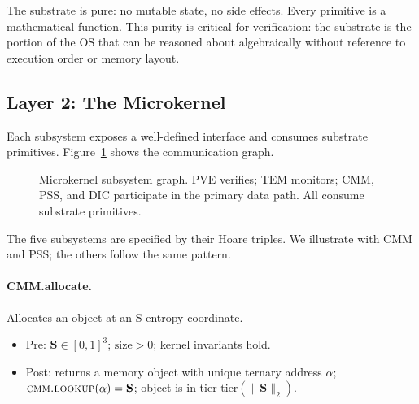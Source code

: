 \documentclass[11pt,twocolumn,a4paper]{article}
\newcommand{\Scoord}{\mathbf{S}}
\begin{document}
The substrate is pure: no mutable state, no side effects. Every primitive is a mathematical function. This purity is critical for verification: the substrate is the portion of the OS that can be reasoned about algebraically without reference to execution order or memory layout.

\subsection{Layer 2: The Microkernel}

Each subsystem exposes a well-defined interface and consumes substrate primitives. Figure~\ref{fig:subsystems} shows the communication graph.

\begin{figure}[htbp]
\centering
{}
\caption{Microkernel subsystem graph. PVE verifies; TEM monitors; CMM, PSS, and DIC participate in the primary data path. All consume substrate primitives.}
\label{fig:subsystems}
\end{figure}

The five subsystems are specified by their Hoare triples. We illustrate with CMM and PSS; the others follow the same pattern.

\paragraph{CMM.allocate.} Allocates an object at an S-entropy coordinate.
\begin{itemize}
\item Pre: $\Scoord \in [0,1]^3$; $\text{size} > 0$; kernel invariants hold.
\item Post: returns a memory object with unique ternary address $\alpha$; $\textsc{cmm.lookup}(\alpha) = \Scoord$; object is in tier $\text{tier}(\|\Scoord\|_2)$.
\end{itemize}
\end{document}
